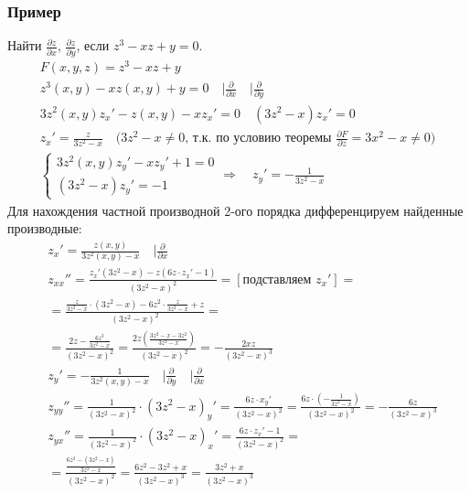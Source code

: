 \subsubsection*{Пример}
Найти $\frac{\partial z}{\partial x}$, $\frac{\partial z}{\partial y}$, если $z^3 - xz + y = 0$.
\begin{gather*}
	F(x,y,z) = z^3 - xz + y\\
	z^3(x,y) - xz(x,y) + y = 0 \quad \Big|\frac{\partial}{\partial x} \quad \Big|\frac{\partial}{\partial y}\\
	3z^2(x,y) z_x' - z(x,y) - x z_x' = 0 \quad (3z^2 - x) z_x' = 0\\
	z_x' = \frac{z}{3z^2 - x} \quad \text{($3z^2 - x \neq 0$, т.к. по условию теоремы $\frac{\partial F}{\partial z} = 3x^2 - x \neq 0$)}\\
	\begin{cases}
		3z^2(x,y) z_y' - xz_y' + 1 = 0\\
		(3z^2 - x)z_y' = -1
	\end{cases}
	\Rightarrow\quad z_y' = -\frac{1}{3z^2 - x}
\end{gather*}
Для нахождения частной производной 2-ого порядка дифференцируем найденные производные:
\begin{align*}
	&\boxed{z_x'} = \frac{z(x,y)}{3z^2(x,y) - x} \quad \Big| \frac{\partial }{\partial x}\\
	&\boxed{z_{xx}''} = \frac{z_x'(3z^2 - x) - z(6z \cdot z_x' - 1)}{(3z^2 - x)^2} = \left[\text{подставляем $z_x'$}\right] =\\
	&= \frac{\frac{z}{3z^2 -x} \cdot (3z^2 - x) - 6z^2 \cdot \frac{z}{3z^2 - x} + z}{(3z^2 - x)^2} = \\
	&= \frac{2z - \frac{6z^3}{3z^2 - x}}{(3z^2 - x)^2} = \frac{2z\left(\frac{3z^2 - x - 3z^2}{3z^2 - x}\right)}{(3z^2 - x)^2} = -\frac{2xz}{(3z^2 - x)^3}\\
	&\boxed{z_y'} = -\frac{1}{3z^2(x,y) - x} \quad \Big|\frac{\partial}{\partial y} \quad \Big| \frac{\partial}{\partial x} \\
	&\boxed{z_{yy}''} = \frac{1}{(3z^2 - x)^2} \cdot (3z^2 - x)_y' = \frac{6z \cdot x_y'}{(3z^2 - x)^2} = \frac{6z \cdot \left(-\frac{1}{3z^2 - x}\right)}{(3z^2 - x)^2} = -\frac{6z}{(3z^2 - x)^3}\\
	&\boxed{z_{yx}''} = \frac{1}{(3z^2 - x)^2} \cdot (3z^2 - x)_x' = \frac{6z \cdot z_x' - 1}{(3z^2 - x)^2} =\\
	&= \frac{\frac{6z^2 - (3z^2 - x)}{3z^2 - x}}{(3z^2 - x)^2} = \frac{6z^2 - 3z^2 + x}{(3z^2 - x)^3} = \frac{3z^2 + x}{(3z^2 - x)^3}
\end{align*}